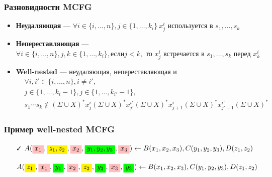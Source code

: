 \documentclass{beamer}
\newcommand{\highlight}[2][yellow]{\mathchoice%
  {\colorbox{#1}{$\displaystyle#2$}}%
  {\colorbox{#1}{$\textstyle#2$}}%
  {\colorbox{#1}{$\scriptstyle#2$}}%
  {\colorbox{#1}{$\scriptscriptstyle#2$}}}%
\begin{document}
\begin{frame}[fragile]
  
  \frametitle{Разновидности MCFG}
  \begin{itemize}
    \item \textbf{Неудаляющая} --- $\forall i \in \{i,\ldots,n\}, j\in \{1,\ldots,k_i\} \ x^i_j \text{ используется в } s_1,\ldots,s_k $
    \pause
    \item \textbf{Непереставляющая} --- $\forall i \in \{i,\ldots,n\}, j,k\in \{1,\ldots,k_i\}, \text{если} j < k, \text{ то } x^i_j \text{ встречается в } s_1,\ldots,s_k  \text{ перед } x^i_k$
    \pause
    \item \textbf{Well-nested} --- неудаляющая, непереставляющая и 
    \begin{align*}
    &\forall i,i' \in \{i,\ldots,n\}, i\neq i', \\
    &j\in \{1,\ldots,k_i-1\}, j\in \{1,\ldots,k_{i'}-1\},\\
    &s_1\cdots s_k \notin (\Sigma \cup X)^* x^i_j (\Sigma \cup X)^* x^{i'}_{j'} (\Sigma \cup X)^* x^i_{j+1} (\Sigma \cup X)^* x^{i'}_{j'+1}(\Sigma \cup X)^*
    \end{align*}
  \end{itemize}
\end{frame}


\begin{frame}[fragile]
  
  \frametitle{Пример well-nested MCFG}
  \begin{itemize}
    \item[\faCheck] $A(\highlight[pink]{x_1},\highlight{z_1,z_2},\highlight[pink]{x_2},\highlight[green]{y_1,y_2,y_3},\highlight[pink]{x_3}) \leftarrow B(x_1,x_2,x_3),C(y_1,y_2,y_3),D(z_1,z_2)$
    \item[\faTimes] $A(\highlight{z_1},\highlight[pink]{x_1},\highlight[green]{y_1},\highlight[pink]{x_2},\highlight{z_2},\highlight[green]{y_2},\highlight[pink]{x_3},\highlight[green]{y_3}) \leftarrow B(x_1,x_2,x_3),C(y_1,y_2,y_3),D(z_1,z_2)$
  \end{itemize}
\end{frame}
\end{document}
